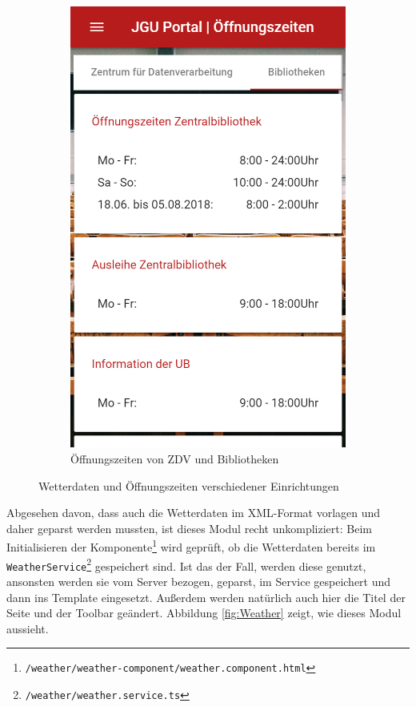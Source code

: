 \begin{figure}
\begin{subfigure}{.5\textwidth}
  \includegraphics[width=.8\linewidth]{gfx/Zeiten}
  \caption{Öffnungszeiten von ZDV und Bibliotheken}
  \label{fig:Zeiten}
\end{subfigure}
\caption{Wetterdaten und Öffnungszeiten verschiedener Einrichtungen}
\label{fig:}
\end{figure}
Abgesehen davon, dass auch die Wetterdaten im \acs{XML}-Format vorlagen und daher geparst werden mussten, ist dieses Modul recht unkompliziert: Beim Initialisieren der Komponente\footnote{\texttt{/weather/weather-component/weather.component.html}} wird geprüft, ob die Wetterdaten bereits im \texttt{WeatherService}\footnote{\texttt{/weather/weather.service.ts}} gespeichert sind. Ist das der Fall, werden diese genutzt, ansonsten werden sie vom Server bezogen, geparst, im Service gespeichert und dann ins Template eingesetzt. Außerdem werden natürlich auch hier die Titel der Seite und der Toolbar geändert. Abbildung \ref{fig:Weather} zeigt, wie dieses Modul aussieht.

